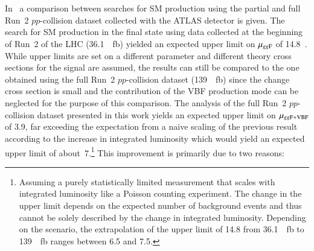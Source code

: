 In~ a comparison between
searches for SM \HH production using the partial and full Run~2 $pp$-collision
dataset collected with the ATLAS detector is given. The search for SM \HH
production in the \bbtautau final state using data collected at the beginning of
Run~2 of the LHC (\SI{36.1}{\per\femto\barn}) yielded an expected upper limit on
$\mu_{gg\text{F}}$ of 14.8~\cite{HIGG-2016-16-witherratum}. While upper limits are set
on a different parameter and different theory cross sections for the signal are
assumed, the results can still be compared to the one obtained using the full
Run~2 $pp$-collision dataset (\SI{139}{\per\femto\barn}) since the change cross
section is small and the contribution of the VBF production mode can be
neglected for the purpose of this comparison. The analysis of the full Run~2
$pp$-collision dataset presented in this work yields an expected upper limit on
$\mu_{gg\text{F}+\text{VBF}}$ of 3.9, far exceeding the expectation from a naive
scaling of the previous result according to the increase in integrated
luminosity which would yield an expected upper limit of
about~7.\footnote{Assuming a purely statistically limited measurement that
  scales with integrated luminosity like a Poisson counting experiment. The
  change in the upper limit depends on the expected number of background events
  and thus cannot be solely described by the change in integrated
  luminosity. Depending on the scenario, the extrapolation of the upper limit of
  \num{14.8} from \SI{36.1}{\per\femto\barn} to \SI{139}{\per\femto\barn} ranges
  between \num{6.5} and \num{7.5}.}  This improvement is primarily due to two
reasons:
